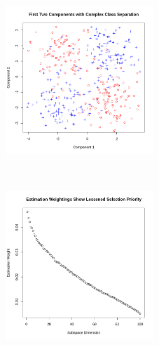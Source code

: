 \documentclass[12pt]{article}
\begin{document}
\begin{figure}[t!]
    \centering
    \begin{subfigure}[t]{0.45\textwidth}
        \centering
        \includegraphics[height=2.2in]{figures/complexboundary.png}
        \caption{}
    \end{subfigure}%
    ~
    \begin{subfigure}[t]{0.45\textwidth}
        \centering
        \includegraphics[height=2.2in]{figures/complexeigs.png}
        \caption{}
    \end{subfigure}


\end{figure}
\end{document}

